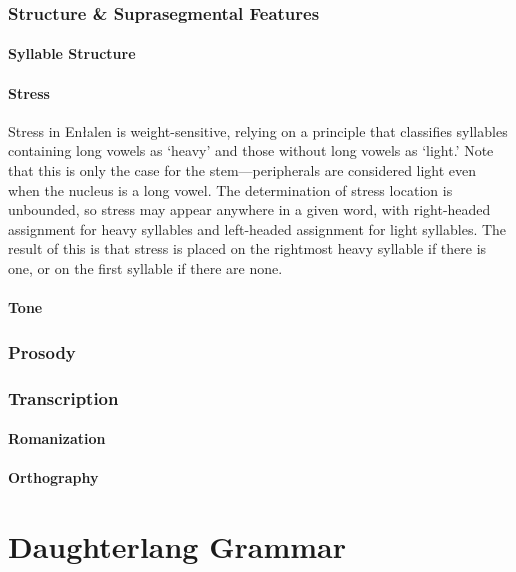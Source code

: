 \documentclass[a4paper,11pt,oneside,openany]{memoir}
\newcommand{\parentlang}{Enłalen}
\newcommand{\childlangone}{Daughterlang}
\begin{document}
\section{Structure \& Suprasegmental Features}

\subsection{Syllable Structure}

\subsection{Stress}

Stress in \parentlang{} is weight-sensitive, relying on a principle that classifies syllables containing long vowels as `heavy' and those without long vowels as `light.' Note that this is only the case for the stem---peripherals are considered light even when the nucleus is a long vowel. The determination of stress location is unbounded, so stress may appear anywhere in a given word, with right-headed assignment for heavy syllables and left-headed assignment for light syllables. The result of this is that stress is placed on the rightmost heavy syllable if there is one, or on the first syllable if there are none.

\subsection{Tone}

\section{Prosody}

\section{Transcription}

\subsection{Romanization}

\subsection{Orthography}

\part{\childlangone{} Grammar}
\end{document}
